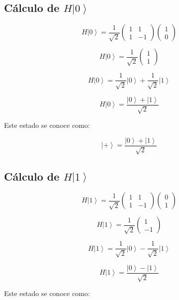 \documentclass[12pt,a4paper]{article}
\newcommand{\ket}[1]{\left|#1\right\rangle}
\begin{document}
\subsection{Cálculo de \texorpdfstring{$H\ket{0}$}{H ket 0}}

\[
H\ket{0}
=
\frac{1}{\sqrt{2}}
\begin{pmatrix}
1 & 1\\
1 & -1
\end{pmatrix}
\begin{pmatrix}
1\\
0
\end{pmatrix}
\]

\[
H\ket{0}
=
\frac{1}{\sqrt{2}}
\begin{pmatrix}
1\\
1
\end{pmatrix}
\]

\[
H\ket{0}
=
\frac{1}{\sqrt{2}}\ket{0}
+
\frac{1}{\sqrt{2}}\ket{1}
\]

\begin{resultado}
\[
\boxed{H\ket{0}=\frac{\ket{0}+\ket{1}}{\sqrt{2}}}
\]
\end{resultado}

Este estado se conoce como:

\[
\ket{+}=\frac{\ket{0}+\ket{1}}{\sqrt{2}}
\]

\subsection{Cálculo de \texorpdfstring{$H\ket{1}$}{H ket 1}}

\[
H\ket{1}
=
\frac{1}{\sqrt{2}}
\begin{pmatrix}
1 & 1\\
1 & -1
\end{pmatrix}
\begin{pmatrix}
0\\
1
\end{pmatrix}
\]

\[
H\ket{1}
=
\frac{1}{\sqrt{2}}
\begin{pmatrix}
1\\
-1
\end{pmatrix}
\]

\[
H\ket{1}
=
\frac{1}{\sqrt{2}}\ket{0}
-
\frac{1}{\sqrt{2}}\ket{1}
\]

\begin{resultado}
\[
\boxed{H\ket{1}=\frac{\ket{0}-\ket{1}}{\sqrt{2}}}
\]
\end{resultado}

Este estado se conoce como:
\end{document}
